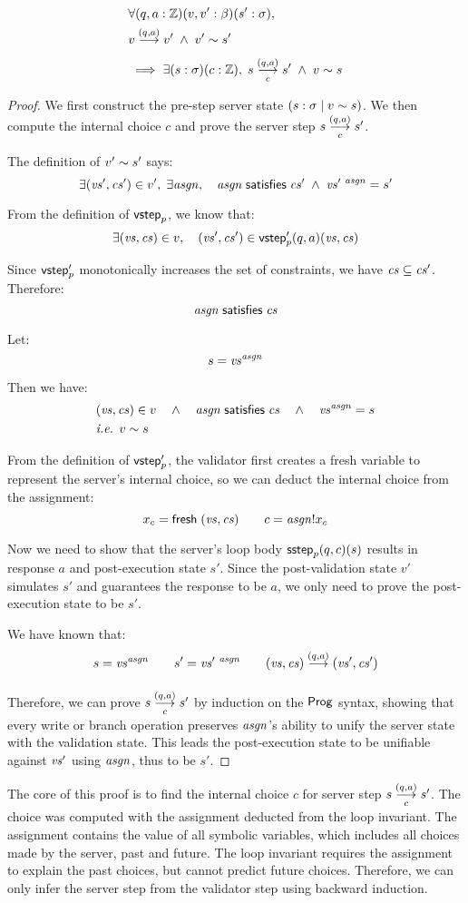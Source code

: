 
\begin{lemma}[\ref{eq:rc2}]
\begin{align*}
&\forall(q,a:\Int)(v,v':\beta)(s':\sigma),\\
&\behaves v{(q,a)}v'\;\wedge\;\Reflects{v'}{s'}\\
&\implies\exists(s:\sigma)(c:\Int),\;\triggers sc{(q,a)}s'\;\wedge\;\Reflects{v}{s}
\end{align*}
\begin{proof}
We first construct the pre-step server state $(s:\sigma\mid v\sim s)$.
We then compute the internal choice $c$ and prove the server step $\triggers
sc{(q,a)}s'$.

The definition of $v'\sim s'$ says:
\[\exists (\mathit{vs}',\mathit{cs}')\in v',\;\exists \mathit{asgn},\quad \mathit{asgn}\;\mathsf{satisfies}\;\mathit{cs}'\;\wedge\;\mathit{vs}'^{~\mathit{asgn}}=s'\]

From the definition of $\mathsf{vstep}_p$, we know that:
\[\exists (\mathit{vs},\mathit{cs})\in v,\quad (\mathit{vs}',\mathit{cs}')\in\mathsf{vstep}'_p(q,a)(\mathit{vs},\mathit{cs})\]

Since $\mathsf{vstep}'_p$ monotonically increases the set of constraints, we have
$\mathit{cs}\subseteq \mathit{cs}'$.  Therefore: \[\mathit{asgn}\;\mathsf{satisfies}\;\mathit{cs}\]

Let: \[s=\mathit{vs}^{\mathit{asgn}}\]

Then we have:
\begin{align*}
&(\mathit{vs},\mathit{cs})\in v\quad\wedge\quad\mathit{asgn}\;\mathsf{satisfies}\;\mathit{cs}\quad\wedge\quad \mathit{vs}^{\mathit{asgn}}=s\\
&\textit{i.e. }v\sim s
\end{align*}

From the definition of $\mathsf{vstep}'_p$, the validator first creates a fresh variable
to represent the server's internal choice, so we can deduct the internal choice
from the assignment:
\[x_c=\mathsf{fresh}\;(\mathit{vs},\mathit{cs})\qquad c=\mathit{asgn}!x_c\]

Now we need to show that the server's loop body $\mathsf{sstep}_p(q,c)(s)$ results in
response $a$ and post-execution state $s'$.  Since the post-validation state
$v'$ simulates $s'$ and guarantees the response to be $a$, we only need to prove
the post-execution state to be $s'$.

We have known that:
\[s=\vs^\asgn\qquad s'=\vs'^{~\asgn}\qquad\behaves{(\vs,\cs)}{(q,a)}{(\vs',\cs')}\]

Therefore, we can prove $\triggers sc{(q,a)}s'$ by induction on the $\mathsf{Prog}$
syntax, showing that every write or branch operation preserves $\mathit{asgn}$'s ability
to unify the server state with the validation state.  This leads the
post-execution state to be unifiable against $\mathit{vs}'$ using $\mathit{asgn}$, thus to be
$s'$.
\end{proof}

The core of this proof is to find the internal choice $c$ for server step
$\triggers sc{(q,a)}s'$.  The choice was computed with the assignment deducted
from the loop invariant.  The assignment contains the value of all symbolic
variables, which includes all choices made by the server, past and future.  The
loop invariant requires the assignment to explain the past choices, but cannot
predict future choices.  Therefore, we can only infer the server step from the
validator step using backward induction.
\end{lemma}

